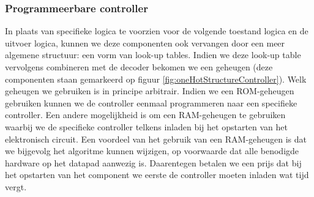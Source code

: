 \subsubsection{Programmeerbare controller}
In plaats van specifieke logica te voorzien voor de volgende toestand logica en de uitvoer logica, kunnen we deze componenten ook vervangen door een meer algemene structuur: een vorm van look-up tables. Indien we deze look-up table vervolgens combineren met de decoder bekomen we een geheugen (deze componenten staan gemarkeerd op figuur \ref{fig:oneHotStructureController}). Welk geheugen we gebruiken is in principe arbitrair. Indien we een ROM-geheugen gebruiken kunnen we de controller eenmaal programmeren naar een specifieke controller. Een andere mogelijkheid is om een RAM-geheugen te gebruiken waarbij we de specifieke controller telkens inladen bij het opstarten van het elektronisch circuit. Een voordeel van het gebruik van een RAM-geheugen is dat we bijgevolg het algoritme kunnen wijzigen, op voorwaarde dat alle benodigde hardware op het datapad aanwezig is. Daarentegen betalen we een prijs dat bij het opstarten van het component we eerste de controller moeten inladen wat tijd vergt.

